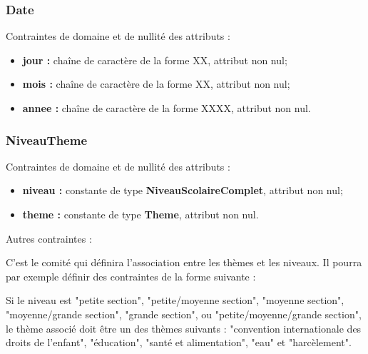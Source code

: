 \subsubsection*{Date}
Contraintes de domaine et de nullité des attributs :
\begin{itemize}
	\item \textbf{jour :} chaîne de caractère de la forme XX, attribut non nul;
	\item \textbf{mois :} chaîne de caractère de la forme XX, attribut non nul;  
	\item \textbf{annee :} chaîne de caractère de la forme XXXX, attribut non nul. 
\end{itemize}

\subsubsection*{NiveauTheme}
Contraintes de domaine et de nullité des attributs :
\begin{itemize}
	\item \textbf{niveau :} constante de type \textbf{NiveauScolaireComplet}, attribut non nul;
	\item \textbf{theme :} constante de type \textbf{Theme}, attribut non nul.\\
\end{itemize}

Autres contraintes :

C'est le comité qui définira l'association entre les thèmes et les niveaux. Il pourra par exemple définir des contraintes de la forme suivante :

Si le niveau est "petite section", "petite/moyenne section", "moyenne section", "moyenne/grande section", "grande section", ou "petite/moyenne/grande section", le thème associé doit être un des thèmes suivants : "convention internationale des droits de l'enfant", "éducation", "santé et alimentation", "eau" et "harcèlement". \\

%
%

